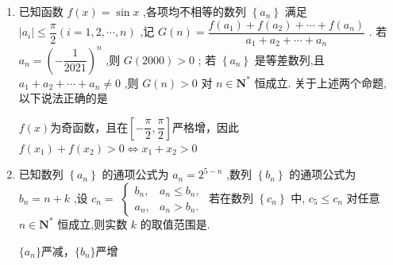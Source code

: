 \begin{enumerate}
    \item 已知函数 $f\left( x\right)  = \sin x$ ,各项均不相等的数列 $\left\{  {a}_{n}\right\}$ 满足 $\left| {a}_{i}\right|  \leq  \dfrac{\pi }{2}\left( {i = 1,2,\cdots ,n}\right)$ ,记 $G\left( n\right)  = \dfrac{f\left( {a}_{1}\right)  + f\left( {a}_{2}\right)  + \cdots  + f\left( {a}_{n}\right) }{{a}_{1} + {a}_{2} + \cdots  + {a}_{n}}$ .
    若 ${a}_{n} = {\left( -\dfrac{1}{2021}\right) }^{n}$ ,则 $G\left( {2000}\right)  > 0$ ; 若 $\left\{  {a}_{n}\right\}$ 是等差数列,且 ${a}_{1} + {a}_{2} + \cdots  + {a}_{n} \neq  0$ ,则 $G\left( n\right)  > 0$ 对 $n \in  {\mathbf{N}}^{ * }$ 恒成立. 关于上述两个命题, 以下说法正确的是
    \begin{jieda}
        $f(x)$为奇函数，且在$\left[-\dfrac{\pi}{2}, \dfrac{\pi}{2}\right]$严格增，因此$f(x_1) + f(x_2) > 0 \Longleftrightarrow x_1 + x_2 > 0$

    \end{jieda}
    
    \item 已知数列 $\left\{  {a}_{n}\right\}$ 的通项公式为 ${a}_{n} = {2}^{5 - n}$ ,数列 $\left\{  {b}_{n}\right\}$ 的通项公式为 ${b}_{n} = n + k$ ,设 ${c}_{n} =$  $\left\{  \begin{array}{ll} {b}_{n}, & {a}_{n} \leq  {b}_{n}, \\  {a}_{n}, & {a}_{n} > {b}_{n}. \end{array}\right.$ 若在数列 $\left\{  {c}_{n}\right\}$ 中, ${c}_{5} \leq  {c}_{n}$ 对任意 $n \in  {\mathbf{N}}^{ * }$ 恒成立,则实数 $k$ 的取值范围是\blkda{$[-5, -3]$}.
    \begin{jieda}
        $\{a_n\}$严减，$\{b_n\}$严增
\end{jieda}
\end{enumerate}
